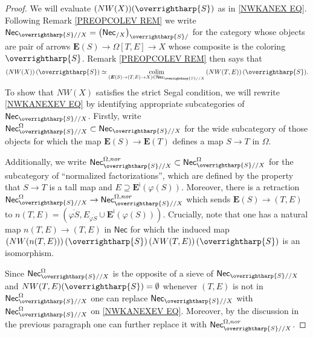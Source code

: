 \documentclass[a4paper,10pt
,draft
]{article}%
\numberwithin{equation}{section}
\numberwithin{figure}{section}
\theoremstyle{definition} %
\newcommand{\vect}[1]{\text{\overrightharp{\ensuremath{#1}}}}
\DeclareMathOperator{\colim}{colim}%
\newcommand{\1}{\ensuremath{\mathbbm 1}}%
\begin{document}
\begin{proof}
	We will evaluate 
	$(NW(X))(\vect{S})$ as in \eqref{NWKANEX EQ}.
	Following Remark \ref{PREOPCOLEV REM}
	we write
	$\mathsf{Nec}_{\vect{S}//X}
	=
	\left(\mathsf{Nec}_{/X}\right)_{\vect{S}/}$
	for the category
	whose objects are pair of arrows
	$\boldsymbol{E}(S) \to \Omega[T,E] \to X$
	whose composite is the coloring $\vect{S}$.
	Remark \ref{PREOPCOLEV REM} then says that
\begin{equation}\label{NWKANEXEV EQ}
\left(NW(X)\right)(\vect{S}) \simeq
\underset{(\boldsymbol{E}(S) \to (T,E) \to X)
	\in \mathsf{Nec}_{\vect{S}//X}}{\colim}
\left(NW(T,E)\right)(\vect{S}).
\end{equation}
To show that $NW(X)$ satisfies the strict Segal condition, 
we will rewrite \eqref{NWKANEXEV EQ} 
by identifying appropriate subcategories of
$\mathsf{Nec}_{\vect{S}//X}$.
Firstly, write
$\mathsf{Nec}_{\vect{S}//X}^{\Omega}
\subset
\mathsf{Nec}_{\vect{S}//X}$
for the wide subcategory of those objects for which the map
$\boldsymbol{E}(S) \to \boldsymbol{E}(T)$
defines a map $S \to T$ in $\Omega$.

Additionally, we write 
$
\mathsf{Nec}_{\vect{S}//X}^{\Omega,nor}
	\subset
\mathsf{Nec}_{\vect{S}//X}^{\Omega}
$
for the subcategory of ``normalized factorizations'',
which are defined by the property that
$S \to T$ is a tall map and
$E \supseteq \boldsymbol{E}^{\mathsf{i}}(\varphi(S))$.
Moreover, 
there is a retraction
$
	\mathsf{Nec}_{\vect{S}//X}^{\Omega}
\to
	\mathsf{Nec}_{\vect{S}//X}^{\Omega,nor}
$
which sends
$\boldsymbol{E}(S) \to (T,E)$ to
$n(T,E)=(\overline{\varphi S},
E_{\overline{\varphi S}} \cup \boldsymbol{E}^{\mathsf{i}}(\varphi(S)))$.
Crucially, note that one has a natural map
$n(T,E) \to (T,E)$ in $\mathsf{Nec}$
for which the induced map
$\left(NW(n(T,E))\right)(\vect{S})
\left(NW(T,E)\right)(\vect{S})$
is an isomorphism.

Since 
$\mathsf{Nec}_{\vect{S}//X}^{\Omega}$
is the opposite of a sieve of 
$\mathsf{Nec}_{\vect{S}//X}$
and 
$NW(T,E)(\vect{S}) = \emptyset$
whenever $(T,E)$ is not in 
$\mathsf{Nec}_{\vect{S}//X}^{\Omega}$
one can replace 
$\mathsf{Nec}_{\vect{S}//X}$
with 
$\mathsf{Nec}_{\vect{S}//X}^{\Omega}$
on
\eqref{NWKANEXEV EQ}.
Moreover, by the discussion in the previous paragraph one can further replace it with 
$\mathsf{Nec}_{\vect{S}//X}^{\Omega,nor}$.


\end{proof}
\end{document}
